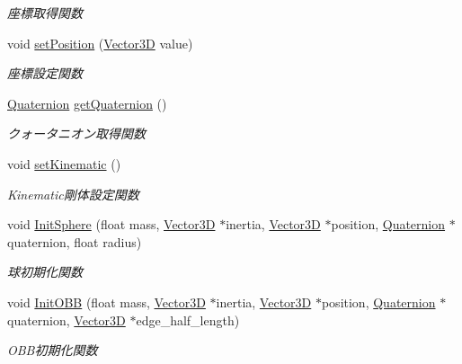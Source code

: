 \begin{DoxyCompactItemize}
\begin{DoxyCompactList}\small\item\em 座標取得関数 \end{DoxyCompactList}\item 
void \mbox{\hyperlink{class_bullet_physics_object_a6a5196bc2fc1fad94bc65a26ff9d5cad}{set\+Position}} (\mbox{\hyperlink{class_vector3_d}{Vector3D}} value)
\begin{DoxyCompactList}\small\item\em 座標設定関数 \end{DoxyCompactList}\item 
\mbox{\hyperlink{_vector3_d_8h_a3ee38c9c46d9851e33a9a1113328dafc}{Quaternion}} \mbox{\hyperlink{class_bullet_physics_object_a58f4fe83f0fe1f298b6e1fef14306903}{get\+Quaternion}} ()
\begin{DoxyCompactList}\small\item\em クォータニオン取得関数 \end{DoxyCompactList}\item 
void \mbox{\hyperlink{class_bullet_physics_object_a563a3aa01fc011dbff8aa64097d7c5a8}{set\+Kinematic}} ()
\begin{DoxyCompactList}\small\item\em Kinematic剛体設定関数 \end{DoxyCompactList}\item 
void \mbox{\hyperlink{class_bullet_physics_object_a94989c5b323cf5f5ce646a78443125b4}{Init\+Sphere}} (float mass, \mbox{\hyperlink{class_vector3_d}{Vector3D}} $\ast$inertia, \mbox{\hyperlink{class_vector3_d}{Vector3D}} $\ast$position, \mbox{\hyperlink{_vector3_d_8h_a3ee38c9c46d9851e33a9a1113328dafc}{Quaternion}} $\ast$quaternion, float radius)
\begin{DoxyCompactList}\small\item\em 球初期化関数 \end{DoxyCompactList}\item 
void \mbox{\hyperlink{class_bullet_physics_object_a24cbe68d50b3ee796e8a1043b55a21c1}{Init\+O\+BB}} (float mass, \mbox{\hyperlink{class_vector3_d}{Vector3D}} $\ast$inertia, \mbox{\hyperlink{class_vector3_d}{Vector3D}} $\ast$position, \mbox{\hyperlink{_vector3_d_8h_a3ee38c9c46d9851e33a9a1113328dafc}{Quaternion}} $\ast$quaternion, \mbox{\hyperlink{class_vector3_d}{Vector3D}} $\ast$edge\+\_\+half\+\_\+length)
\begin{DoxyCompactList}\small\item\em O\+B\+B初期化関数 \end{DoxyCompactList}\item 

\end{DoxyCompactItemize}
